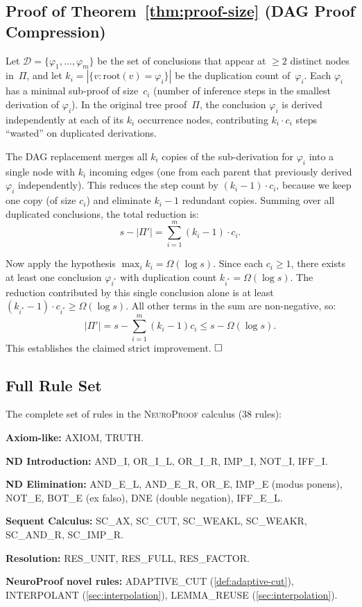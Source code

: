 \documentclass[conference]{IEEEtran}
\newcommand{\NP}{\textsc{NeuroProof}}
\begin{document}
\subsection{Proof of Theorem~\ref{thm:proof-size}
  (DAG Proof Compression)}

Let $\mathcal{D} = \{\varphi_1, \ldots, \varphi_m\}$ be the set of
conclusions that appear at $\geq 2$ distinct nodes in~$\Pi$, and let
$k_i = |\{v : \mathrm{root}(v) = \varphi_i\}|$ be the duplication count
of~$\varphi_i$.  Each $\varphi_i$ has a minimal sub-proof of
size~$c_i$ (number of inference steps in the smallest derivation of
$\varphi_i$).  In the original tree proof~$\Pi$, the conclusion
$\varphi_i$ is derived independently at each of its $k_i$ occurrence
nodes, contributing $k_i \cdot c_i$ steps ``wasted'' on duplicated
derivations.

The DAG replacement merges all $k_i$ copies of the sub-derivation for
$\varphi_i$ into a single node with $k_i$ incoming edges (one from each
parent that previously derived $\varphi_i$ independently).  This reduces
the step count by $(k_i - 1) \cdot c_i$, because we keep one copy
(of size $c_i$) and eliminate $k_i - 1$ redundant copies.  Summing over
all duplicated conclusions, the total reduction is:
\[
  s - |\Pi'| = \sum_{i=1}^{m} (k_i - 1) \cdot c_i.
\]

Now apply the hypothesis
$\max_i k_i = \Omega(\log s)$.  Since each $c_i \geq 1$, there exists
at least one conclusion $\varphi_{i^*}$ with duplication count
$k_{i^*} = \Omega(\log s)$.  The reduction contributed by this single
conclusion alone is at least
$(k_{i^*} - 1) \cdot c_{i^*} \geq \Omega(\log s)$.  All other terms in
the sum are non-negative, so:
\[
  |\Pi'| = s - \sum_{i=1}^{m}(k_i - 1) c_i
         \leq s - \Omega(\log s).
\]
This establishes the claimed strict improvement.  $\hfill\square$

\subsection{Full Rule Set}

The complete set of rules in the \NP{} calculus (38 rules):

\medskip
\textbf{Axiom-like:} AXIOM, TRUTH.

\textbf{ND Introduction:} AND\_I, OR\_I\_L, OR\_I\_R, IMP\_I,
NOT\_I, IFF\_I.

\textbf{ND Elimination:} AND\_E\_L, AND\_E\_R, OR\_E, IMP\_E
(modus ponens), NOT\_E, BOT\_E (ex falso), DNE (double negation),
IFF\_E\_L.

\textbf{Sequent Calculus:} SC\_AX, SC\_CUT, SC\_WEAKL, SC\_WEAKR,
SC\_AND\_R, SC\_IMP\_R.

\textbf{Resolution:} RES\_UNIT, RES\_FULL, RES\_FACTOR.

\textbf{NeuroProof novel rules:} ADAPTIVE\_CUT
(\cref{def:adaptive-cut}), INTERPOLANT (\cref{sec:interpolation}),
LEMMA\_REUSE (\cref{sec:interpolation}).
\end{document}
